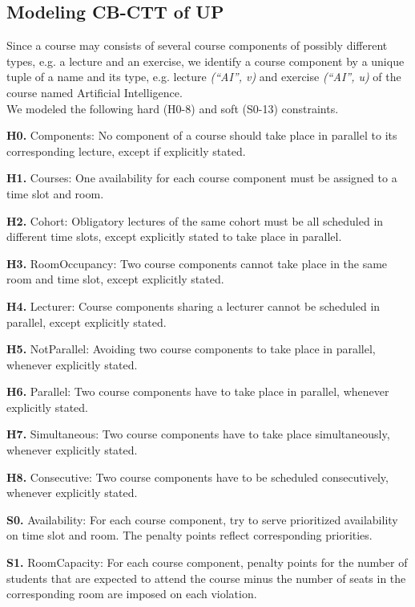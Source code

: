 \documentclass{easychair}
\newcommand{\CBCTT}{CB-CTT}
\newcommand{\UP}{UP}
\begin{document}
\subsection{Modeling \CBCTT{} of \UP{}}
\label{subsec:modeling}
  Since a course may consists of several course components of possibly different types, e.g. a lecture and an exercise, we identify a course component by a unique tuple of a name and its type, e.g. lecture \textit{(``AI'', v)} and exercise \textit{(``AI'', u)} of the course named Artificial Intelligence. \\
  We modeled the following hard (H0-8) and soft (S0-13) constraints. 

  \textbf{H0.} Components: No component of a course should take place in parallel to its corresponding lecture, except if explicitly stated. 

  \textbf{H1.} Courses: One availability for each course component must be assigned to a time slot and room. 

  \textbf{H2.} Cohort: Obligatory lectures of the same cohort must be all scheduled in different time slots, except explicitly stated to take place in parallel. 

  \textbf{H3.} RoomOccupancy: Two course components cannot take place in the same room and time slot, except explicitly stated. 

  \textbf{H4.} Lecturer: Course components sharing a lecturer cannot be scheduled in parallel, except explicitly stated. 

  \textbf{H5.} NotParallel: Avoiding two course components to take place in parallel, whenever explicitly stated.

  \textbf{H6.} Parallel: Two course components have to take place in parallel, whenever explicitly stated.

  \textbf{H7.} Simultaneous: Two course components have to take place simultaneously, whenever explicitly stated.

  \textbf{H8.} Consecutive: Two course components have to be scheduled consecutively, whenever explicitly stated.

  \textbf{S0.} Availability: For each course component, try to serve prioritized availability on time slot and room. The penalty points reflect corresponding priorities.  

  \textbf{S1.} RoomCapacity: For each course component, penalty points for the number of students that are expected to attend the course minus the number of seats in the corresponding room are imposed on each violation. 
\end{document}
